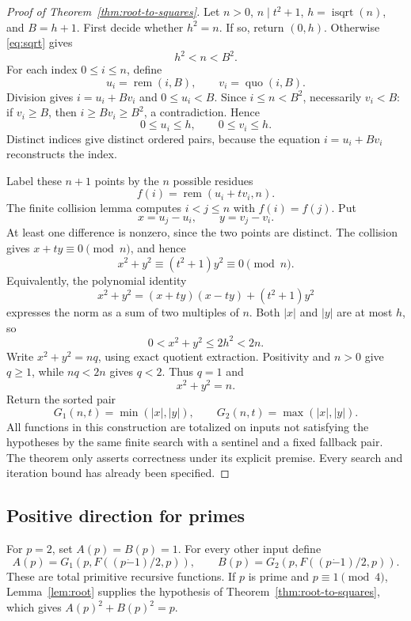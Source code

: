 \documentclass[11pt,letterpaper]{article}
\theoremstyle{definition}
\theoremstyle{remark}
\newcommand{\sqroot}{\operatorname{isqrt}}
\newcommand{\remd}{\operatorname{rem}}
\newcommand{\quod}{\operatorname{quo}}
\newcommand{\abs}[1]{\lvert #1\rvert}
\newcommand{\monus}{\mathbin{\dot{-}}}
\begin{document}
\begin{proof}[Proof of Theorem~\ref{thm:root-to-squares}]
Let \(n>0\), \(n\mid t^2+1\), \(h=\sqroot(n)\), and \(B=h+1\).
First decide whether \(h^2=n\). If so, return \((0,h)\).
Otherwise \eqref{eq:sqrt} gives
\[
 h^2<n<B^2.
\]
For each index \(0\le i\le n\), define
\[
 u_i=\remd(i,B),\qquad v_i=\quod(i,B).
\]
Division gives \(i=u_i+Bv_i\) and \(0\le u_i<B\).
Since \(i\le n<B^2\), necessarily \(v_i<B\): if \(v_i\ge B\),
then \(i\ge Bv_i\ge B^2\), a contradiction. Hence
\[
 0\le u_i\le h,\qquad 0\le v_i\le h.
\]
Distinct indices give distinct ordered pairs, because the equation
\(i=u_i+Bv_i\) reconstructs the index.

Label these \(n+1\) points by the \(n\) possible residues
\[
 f(i)=\remd(u_i+t v_i,n).
\]
The finite collision lemma computes \(i<j\le n\) with \(f(i)=f(j)\).
Put
\[
 x=u_j-u_i,\qquad y=v_j-v_i.
\]
At least one difference is nonzero, since the two points are distinct.
The collision gives \(x+ty\equiv0\pmod n\), and hence
\[
 x^2+y^2\equiv (t^2+1)y^2\equiv0\pmod n.
\]
Equivalently, the polynomial identity
\begin{equation}
 x^2+y^2=(x+ty)(x-ty)+(t^2+1)y^2
 \label{eq:divisible}
\end{equation}
expresses the norm as a sum of two multiples of \(n\).
Both \(\abs{x}\) and \(\abs{y}\) are at most \(h\), so
\begin{equation}
 0<x^2+y^2\le2h^2<2n.
 \label{eq:shortnorm}
\end{equation}
Write \(x^2+y^2=nq\), using exact quotient extraction.
Positivity and \(n>0\) give \(q\ge1\), while \(nq<2n\) gives \(q<2\).
Thus \(q=1\) and
\[
 x^2+y^2=n.
\]
Return the sorted pair
\[
 G_1(n,t)=\min(\abs{x},\abs{y}),\qquad
 G_2(n,t)=\max(\abs{x},\abs{y}).
\]
All functions in this construction are totalized on inputs not satisfying
the hypotheses by the same finite search with a sentinel and a fixed
fallback pair. The theorem only asserts correctness under its explicit
premise. Every search and iteration bound has already been specified.
\end{proof}

\subsection{Positive direction for primes}

For \(p=2\), set \(A(p)=B(p)=1\).
For every other input define
\[
 A(p)=G_1(p,F((p\monus1)/2,p)),\qquad
 B(p)=G_2(p,F((p\monus1)/2,p)).
\]
These are total primitive recursive functions. If \(p\) is prime and
\(p\equiv1\pmod4\), Lemma~\ref{lem:root} supplies the hypothesis of
Theorem~\ref{thm:root-to-squares}, which gives \(A(p)^2+B(p)^2=p\).
\end{document}
